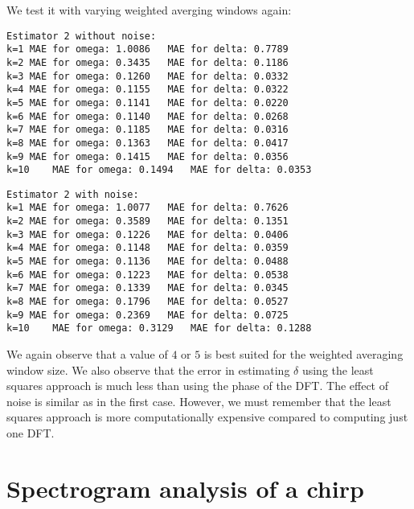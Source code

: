 \documentclass[11pt]{article}
\begin{document}
	

	

	
		
    We test it with varying weighted averging windows again:

	

	

    \begin{Verbatim}[commandchars=\\\{\}]
Estimator 2 without noise:
k=1	MAE for omega: 1.0086	MAE for delta: 0.7789
k=2	MAE for omega: 0.3435	MAE for delta: 0.1186
k=3	MAE for omega: 0.1260	MAE for delta: 0.0332
k=4	MAE for omega: 0.1155	MAE for delta: 0.0322
k=5	MAE for omega: 0.1141	MAE for delta: 0.0220
k=6	MAE for omega: 0.1140	MAE for delta: 0.0268
k=7	MAE for omega: 0.1185	MAE for delta: 0.0316
k=8	MAE for omega: 0.1363	MAE for delta: 0.0417
k=9	MAE for omega: 0.1415	MAE for delta: 0.0356
k=10	MAE for omega: 0.1494	MAE for delta: 0.0353

    \end{Verbatim}

	

    \begin{Verbatim}[commandchars=\\\{\}]
Estimator 2 with noise:
k=1	MAE for omega: 1.0077	MAE for delta: 0.7626
k=2	MAE for omega: 0.3589	MAE for delta: 0.1351
k=3	MAE for omega: 0.1226	MAE for delta: 0.0406
k=4	MAE for omega: 0.1148	MAE for delta: 0.0359
k=5	MAE for omega: 0.1136	MAE for delta: 0.0488
k=6	MAE for omega: 0.1223	MAE for delta: 0.0538
k=7	MAE for omega: 0.1339	MAE for delta: 0.0345
k=8	MAE for omega: 0.1796	MAE for delta: 0.0527
k=9	MAE for omega: 0.2369	MAE for delta: 0.0725
k=10	MAE for omega: 0.3129	MAE for delta: 0.1288

    \end{Verbatim}

	
		
    We again observe that a value of \(4\) or \(5\) is best suited for the
weighted averaging window size. We also observe that the error in
estimating \(\delta\) using the least squares approach is much less than
using the phase of the DFT. The effect of noise is similar as in the
first case. However, we must remember that the least squares approach is
more computationally expensive compared to computing just one DFT.

	

	
		
    \section{Spectrogram analysis of a
chirp}\label{spectrogram-analysis-of-a-chirp}
\end{document}
